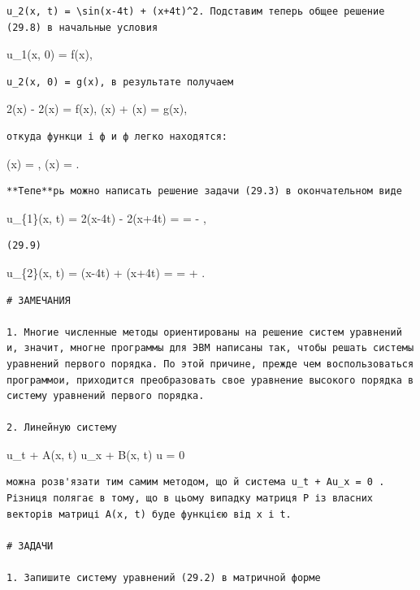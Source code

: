\documentclass[
  ukrainian,
]{article}
\begin{document}
\begin{verbatim}
u_2(x, t) = \sin(x-4t) + (x+4t)^2. Подставим теперь общее решение (29.8) в начальные условия
\end{verbatim}

u\_1(x, 0) = f(x),

\begin{verbatim}
u_2(x, 0) = g(x), в результате получаем
\end{verbatim}

2\varphi(x) - 2\psi(x) = f(x), \varphi(x) + \psi(x) = g(x),

\begin{verbatim}
откуда функци і ф и ф легко находятся:
\end{verbatim}

\varphi(x) =  \left[ f(x) + 2g(x) \right], \psi(x) =
 \left[ 2g(x) - f(x) \right].

\begin{verbatim}
**Тепе**рь можно написать решение задачи (29.3) в окончательном виде
\end{verbatim}

u\_\{1\}(x, t) = 2\varphi(x-4t) - 2\psi(x+4t) = = 
\left[ f(x-4t) + 2g(x-4t) \right] - 
\left[ 2g(x+4t) - f(x+4t) \right],

\begin{verbatim}
(29.9)
\end{verbatim}

u\_\{2\}(x, t) = \varphi(x-4t) + \psi(x+4t) = = 
\left[ f(x-4t) + 2g(x-4t) \right] + 
\left[ 2g(x+4t) - f(x+4t) \right].

\begin{verbatim}
# ЗАМЕЧАНИЯ

1. Многие численные методы ориентированы на решение систем уравнений и, значит, многне программы для ЭВМ написаны так, чтобы решать системы уравнений первого порядка. По этой причине, прежде чем воспользоваться программои, приходится преобразовать свое уравнение высокого порядка в систему уравнений первого порядка.

2. Линейную систему
\end{verbatim}

u\_t + A(x, t) u\_x + B(x, t) u = 0

\begin{verbatim}
можна розв'язати тим самим методом, що й система u_t + Au_x = 0 . Різниця полягає в тому, що в цьому випадку матриця P із власних векторів матриці A(x, t) буде функцією від x і t.

# ЗАДАЧИ

1. Запишите систему уравнений (29.2) в матричной форме
\end{verbatim}
\end{document}
